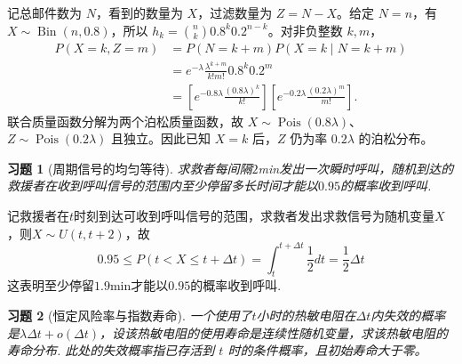 \documentclass[UTF8,12pt,a4paper,fontset=fandol]{ctexart}
\newtheorem{exercise}{习题}[section]
\begin{document}
\begin{solve}\label{a:Y3.9}记总邮件数为 $N$，看到的数量为 $X$，过滤数量为 $Z=N-X$。给定 $N=n$，有 $X\sim\operatorname{Bin}(n,0.8)$，所以 $h_k=\binom nk0.8^k0.2^{n-k}$。对非负整数 $k,m$，\[\begin{aligned}P(X=k,Z=m)&=P(N=k+m)P(X=k\mid N=k+m)\\&=e^{-\lambda}\frac{\lambda^{k+m}}{k!m!}0.8^k0.2^m\\&=\left[e^{-0.8\lambda}\frac{(0.8\lambda)^k}{k!}\right]\left[e^{-0.2\lambda}\frac{(0.2\lambda)^m}{m!}\right].\end{aligned}\]联合质量函数分解为两个泊松质量函数，故 $X\sim\operatorname{Pois}(0.8\lambda)$、$Z\sim\operatorname{Pois}(0.2\lambda)$ 且独立。因此已知 $X=k$ 后，$Z$ 仍为率 $0.2\lambda$ 的泊松分布。\end{solve}

\begin{exercise}[周期信号的均匀等待]\label{q:Y3.13}
求救者每间隔$2$min发出一次瞬时呼叫，随机到达的救援者在收到呼叫信号的范围内至少停留多长时间才能以$0.95$的概率收到呼叫.\par{}
\end{exercise}

\begin{solve}\label{a:Y3.13}
记救援者在$t$时刻到达可收到呼叫信号的范围，求救者发出求救信号为随机变量$X$，则$X\sim U(t,t+2)$，故
\[0.95 \leqslant P(t < X \leqslant t + \Delta t) = \int_t^{t + \Delta t} {\frac{1}{2}dt}  = \frac{1}{2}\Delta t\]
这表明至少停留$1.9$min才能以$0.95$的概率收到呼叫.
\end{solve}

\begin{exercise}[恒定风险率与指数寿命]\label{q:Y3.14}
一个使用了$t$小时的热敏电阻在$\Delta t$内失效的概率是$\lambda \Delta t+o(\Delta t)$，设该热敏电阻的使用寿命是连续性随机变量，求该热敏电阻的寿命分布. 此处的失效概率指已存活到 $t$ 时的条件概率，且初始寿命大于零。\par{}
\end{exercise}
\end{document}
